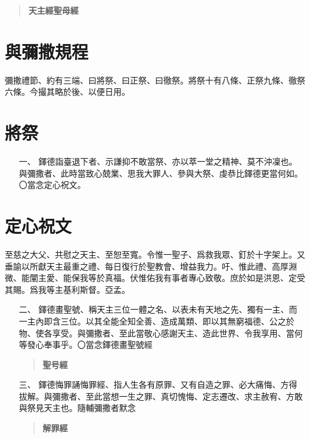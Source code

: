 \begin{quote}
    \bfseries 天主經\quad 聖母經
\end{quote}

\section*{與彌撒規程}
{\small 彌撒禮節、約有三端、曰將祭、曰正祭、曰徹祭。將祭十有八條、正祭九條、徹祭六條。今撮其略於後、以便日用。}

\section{將祭}
\begin{enumerate}
    \item[一、] {\small 鐸德詣臺退下者、示謙抑不敢當祭、亦以萃一堂之精神、莫不沖凜也。與彌撒者、此時當致心兢業、思我大罪人、參與大祭、虔恭比鐸德更當何如。〇當念定心祝文。}
\end{enumerate}

\section*{定心祝文}
至慈之大父、共慰之天主、至恕至寬。令惟一聖子、爲救我眾、釘於十字架上。又垂諭以所獻天主最重之禮、每日復行於聖教會、增益我力。吁、惟此禮、高厚淵微、能闡主愛、能保我等於真福。伏惟佑我有事者專心致敬。庶於如是洪恩、定受其賜。爲我等主基利斯督。{\cspace}亞孟。

\begin{enumerate}
    \item[二、]{\small 鐸德畫聖號、稱天主三位一體之名、以表未有天地之先、獨有一主、而一主內即含三位。以其全能全知全善、造成萬類、即以其無窮福德、公之於物、使各享受。與彌撒者、至此當敬心感謝天主、造此世界、令我享用、當何等發心奉事乎。〇當念鐸德畫聖號經}
    \begin{quote}
    \bfseries 聖号經
    \end{quote}    
\end{enumerate}
\begin{enumerate}
    \item[三、]{\small 鐸德悔罪誦悔罪經、指人生各有原罪、又有自造之罪、必大痛悔、方得拔解。與彌撒者、至此當想一生之罪、真切愧悔、定志遷改、求主赦宥、方敢與祭見天主也。隨輔彌撒者默念}
    \begin{quote}
        \bfseries 解罪經
    \end{quote}
\end{enumerate}
 
